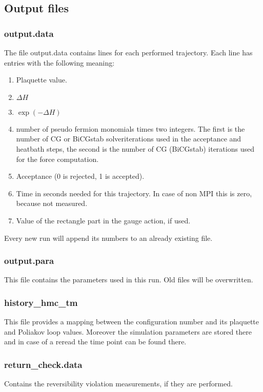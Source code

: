 \subsection{Output files}

\subsubsection*{\ttfamily output.data}

The file {\ttfamily output.data} contains lines for each performed
trajectory. Each line has entries with the following meaning:
\begin{enumerate}
\item Plaquette value.
\item $\Delta H$
\item $\exp(-\Delta H)$
\item number of pseudo fermion monomials times two integers. The first
  is the number of CG or BiCGstab solveriterations used in the acceptance
  and heatbath steps, the second is the number of CG (BiCGstab) iterations 
  used for the force computation.
\item Acceptance (0 is rejected, 1 is accepted).
\item Time in seconds needed for this trajectory. In case of non MPI
  this is zero, because not measured.
\item Value of the rectangle part in the gauge action, if used.
\end{enumerate}
Every new run will append its numbers to an already existing file.

\subsubsection*{\ttfamily output.para}
This file contains the parameters used in this run. Old files will be
overwritten. 

\subsubsection*{\ttfamily history\_hmc\_tm}
This file provides a mapping between the configuration number and its
plaquette and Poliakov loop values. Moreover the simulation parameters
are stored there and in case of a reread the time point can be found there. 

\subsubsection*{\ttfamily return\_check.data}
Contains the reversibility violation measurements, if they are
performed. 


